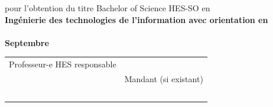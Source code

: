 \begin{titlepage}
\begin{center}
{{				%
				{\large pour l’obtention du titre Bachelor of Science HES-SO en\\[10pt]
				
				 \fontsize{14pt}{20pt} \textbf{Ingénierie des technologies de l’information avec orientation en\\ \Orientation }\\[32pt]
				
				\textbf{Septembre \Year}}\\[49pt]
				
				{
					\begin{tabular*}{16cm}{>{\centering}m{7.59cm}>{\centering}m{7.58cm}}
						Professeur-e HES responsable\\[13pt]
						\textbf{ \Professor }
						&
						Mandant (si existant)\\[12pt]
						\textbf{ \Client }
					\end{tabular*}
				}
			}
			\vfill
		}%
	\end{center}
\end{titlepage}
\addtocounter{page}{1}
